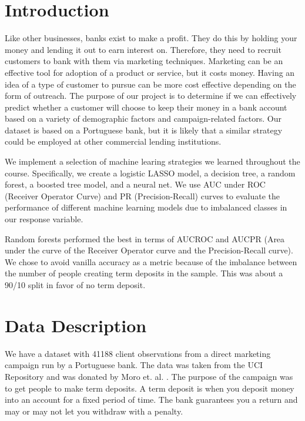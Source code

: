 \documentclass[12pt]{article}
\begin{document}
\clearpage \newpage
\section*{Introduction}
Like other businesses, banks exist to make a profit. They do this by holding your
money and lending it out to earn interest on. Therefore, they need to recruit 
customers to bank with them via marketing techniques. Marketing can be an  effective tool for adoption of a product or service, but it costs money. Having an idea of a type of customer to pursue can be more cost effective depending on the form of outreach. The purpose of our project is to determine if we can 
effectively predict whether a customer will choose to keep their money in a bank
account based on a variety of demographic factors and campaign-related factors. 
Our dataset is based on a Portuguese bank, but it is likely that a similar strategy could be employed at other commercial lending institutions.

We implement a selection of machine learing strategies we learned throughout the course. Specifically, we create a logistic LASSO model, a decision tree, a random forest, a boosted tree model, and a neural net. We use AUC under ROC (Receiver Operator Curve) and PR (Precision-Recall) curves to evaluate the performance of different machine learning models due to imbalanced classes in our response variable.

Random forests performed the best in terms of AUCROC and AUCPR (Area under the curve of the Receiver Operator curve and the Precision-Recall curve). We chose to avoid vanilla accuracy as a metric because of the imbalance between the number of people creating term deposits in the sample. This was about a 90/10 split in favor of no term deposit.

\section*{Data Description}
We have a dataset with 41188 client observations from a direct marketing campaign
run by a Portuguese bank. The data was taken from the UCI Repository and was donated by Moro et. al. \cite{moro2014data}. The purpose of the campaign was to get people to 
make term deposits. A term deposit is when you deposit money into 
an account for a fixed period of time. The bank guarantees you a return and may
or may not let you withdraw with a penalty. \cite{investopedia}
\end{document}
